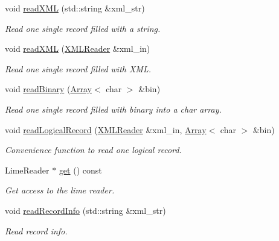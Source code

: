 \begin{DoxyCompactItemize}
\item 
void \mbox{\hyperlink{group__qio_gae57feac2bf53666ac092bb0a43125226}{read\+X\+ML}} (std\+::string \&xml\+\_\+str)
\begin{DoxyCompactList}\small\item\em Read one single record filled with a string. \end{DoxyCompactList}\item 
void \mbox{\hyperlink{group__qio_ga9a1ac411577bd50e643f483119318893}{read\+X\+ML}} (\mbox{\hyperlink{classADATXML_1_1XMLReader}{X\+M\+L\+Reader}} \&xml\+\_\+in)
\begin{DoxyCompactList}\small\item\em Read one single record filled with X\+ML. \end{DoxyCompactList}\item 
void \mbox{\hyperlink{group__qio_ga40b41bda2b27ce68a0ac0ee28124fc64}{read\+Binary}} (\mbox{\hyperlink{classXMLArray_1_1Array}{Array}}$<$ char $>$ \&bin)
\begin{DoxyCompactList}\small\item\em Read one single record filled with binary into a char array. \end{DoxyCompactList}\item 
void \mbox{\hyperlink{group__qio_ga7d36d6dd7fef90986d0c435ddaa86eae}{read\+Logical\+Record}} (\mbox{\hyperlink{classADATXML_1_1XMLReader}{X\+M\+L\+Reader}} \&xml\+\_\+in, \mbox{\hyperlink{classXMLArray_1_1Array}{Array}}$<$ char $>$ \&bin)
\begin{DoxyCompactList}\small\item\em Convenience function to read one logical record. \end{DoxyCompactList}\item 
Lime\+Reader $\ast$ \mbox{\hyperlink{group__qio_ga40c1ee10fe351724bdfc91f4fd655328}{get}} () const
\begin{DoxyCompactList}\small\item\em Get access to the lime reader. \end{DoxyCompactList}\item 
void \mbox{\hyperlink{group__qio_gade5b9d659e34ec9c9de267858a675d7d}{read\+Record\+Info}} (std\+::string \&xml\+\_\+str)
\begin{DoxyCompactList}\small\item\em Read record info. \end{DoxyCompactList}\item 

\end{DoxyCompactItemize}
